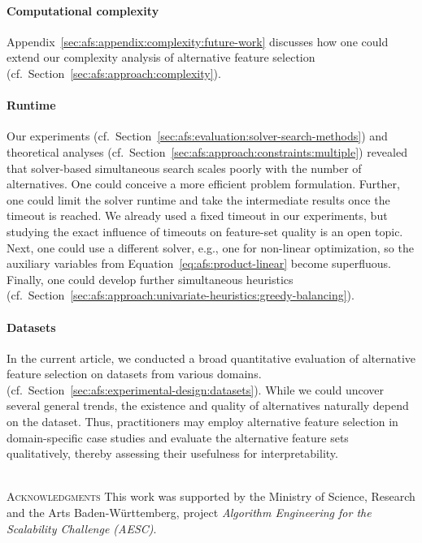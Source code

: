 \documentclass{article}
\theoremstyle{definition}
\begin{document}
\paragraph{Computational complexity} Appendix~\ref{sec:afs:appendix:complexity:future-work} discusses how one could extend our complexity analysis of alternative feature selection (cf.~Section~\ref{sec:afs:approach:complexity}).

\paragraph{Runtime}

Our experiments (cf.~Section~\ref{sec:afs:evaluation:solver-search-methods}) and theoretical analyses (cf.~Section~\ref{sec:afs:approach:constraints:multiple}) revealed that solver-based simultaneous search scales poorly with the number of alternatives.
One could conceive a more efficient problem formulation.
Further, one could limit the solver runtime and take the intermediate results once the timeout is reached.
We already used a fixed timeout in our experiments, but studying the exact influence of timeouts on feature-set quality is an open topic.
Next, one could use a different solver, e.g., one for non-linear optimization, so the auxiliary variables from Equation~\ref{eq:afs:product-linear} become superfluous.
Finally, one could develop further simultaneous heuristics (cf.~Section~\ref{sec:afs:approach:univariate-heuristics:greedy-balancing}).

\paragraph{Datasets}

In the current article, we conducted a broad quantitative evaluation of alternative feature selection on datasets from various domains. (cf.~Section~\ref{sec:afs:experimental-design:datasets}).
While we could uncover several general trends, the existence and quality of alternatives naturally depend on the dataset.
Thus, practitioners may employ alternative feature selection in domain-specific case studies and evaluate the alternative feature sets qualitatively, thereby assessing their usefulness for interpretability.

~\\
\noindent \textsc{Acknowledgments}\quad
This work was supported by the Ministry of Science, Research and the Arts Baden-Württemberg, project \emph{Algorithm Engineering for the Scalability Challenge (AESC)}.
\end{document}
